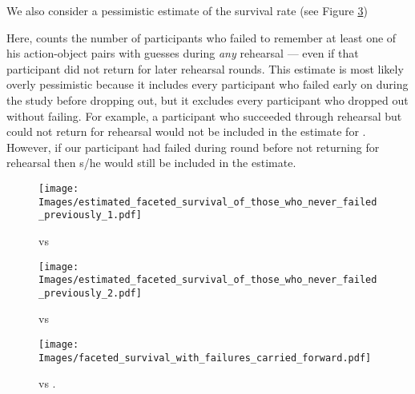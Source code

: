 We also consider a pessimistic estimate of the survival rate (see Figure \ref{fig:FacetedTotalSurvival})  
  
Here,  counts the number of participants who failed to remember at least one of his action-object pairs with  guesses during {\em any} rehearsal  --- even if that participant did not return for later rehearsal rounds. This estimate is most likely overly pessimistic because it includes every participant who failed early on during the study before dropping out, but it excludes every participant who dropped out without failing. For example, a participant who succeeded through rehearsal  but could not return for rehearsal  would not be included in the estimate for . However, if our participant had failed during round  before not returning for rehearsal  then s/he would still be included in the estimate.
\begin{figure}[tb]
\centering
\texttt{[image: Images/estimated\_faceted\_survival\_of\_those\_who\_never\_failed\_previously\_1.pdf]}
\caption{ vs }
\label{fig:EstimatedFacetedConditionalSurvivalProbability2}
\end{figure}


\begin{figure}
\centering
\texttt{[image: Images/estimated\_faceted\_survival\_of\_those\_who\_never\_failed\_previously\_2.pdf]}
\caption{ vs }
\label{fig:EstimatedSurvivalProbabilityMethod2}
\end{figure}


\begin{figure}
\centering
\texttt{[image: Images/faceted\_survival\_with\_failures\_carried\_forward.pdf]}
\caption{ vs .}
\label{fig:FacetedTotalSurvival}
\end{figure}



